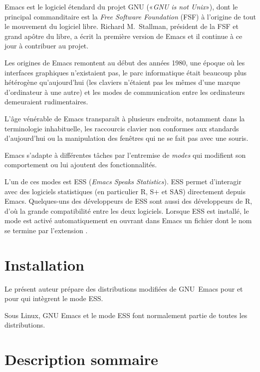 Emacs est le logiciel étendard du projet GNU («\emph{GNU is not
  Unix}»), dont le principal commanditaire est la \emph{Free Software
  Foundation} (FSF) à l'origine de tout le mouvement du logiciel
libre. Richard M.\ Stallman, président de la FSF et grand apôtre du
libre, a écrit la première version de Emacs et il continue à ce jour à
contribuer au projet.

Les origines de Emacs remontent au début des années 1980, une époque
où les interfaces graphiques n'existaient pas, le parc informatique
était beaucoup plus hétérogène qu'aujourd'hui (les claviers n'étaient
pas les mêmes d'une marque d'ordinateur à une autre) et les modes de
communication entre les ordinateurs demeuraient rudimentaires.

L'âge vénérable de Emacs transparaît à plusieurs endroits, notamment
dans la terminologie inhabituelle, les raccourcis clavier non
conformes aux standards d'aujourd'hui ou la manipulation des fenêtres
qui ne se fait pas avec une souris.

Emacs s'adapte à différentes tâches par l'entremise de \emph{modes}
qui modifient son comportement ou lui ajoutent des fonctionnalités.

L'un de ces modes est ESS (\emph{Emacs Speaks Statistics}). ESS permet
d'interagir avec des logiciels statistiques (en particulier R, S+ et
SAS) directement depuis Emacs. Quelques-uns des développeurs de ESS
sont aussi des développeurs de R, d'où la grande compatibilité entre
les deux logiciels. Lorsque ESS est installé, le mode est activé
automatiquement en ouvrant dans Emacs un fichier dont le nom se
termine par l'extension .


\section{Installation}
\label{sec:emacs+ess:installation}

Le présent auteur prépare des distributions modifiées de GNU~Emacs
pour 
et pour 
qui intègrent le mode ESS.

Sous Linux, GNU Emacs et le mode ESS font normalement partie de toutes
les distributions.

\section{Description sommaire}
\label{sec:emacs+ess:description}

